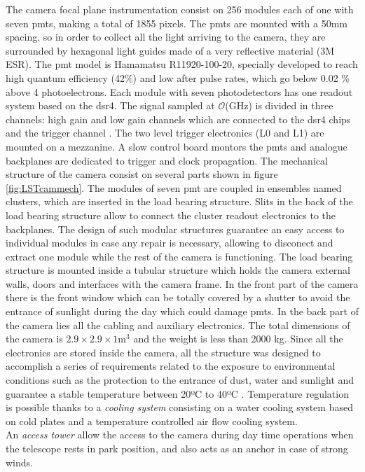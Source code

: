 \documentclass[main.tex]{subfiles}
\begin{document}
  The camera focal plane instrumentation consist on 256 modules each of one with seven \glspl{pmt}, making a total of 1855 pixels. The \glspl{pmt} are mounted with a 50mm spacing, so in order to collect all the light arriving to the camera, they are surrounded by hexagonal light guides made of a very reflective material (3M ESR). The \gls{pmt} model is Hamamatsu R11920-100-20, specially developed to reach high quantum efficiency (42\%) and low after pulse rates, which go below 0.02 \% above 4 photoelectrons. Each module with seven photodetectors has one readout system based on the \gls{dsr4}. The signal sampled at $\mathcal{O}$(GHz) is divided in three channels: high gain and low gain channels which are connected to the \gls{dsr4} chips and the trigger channel \cite{2017LST}. The two level trigger electronics (L0 and L1) are mounted on a mezzanine. A slow control board montors the \glspl{pmt} and analogue backplanes are dedicated to trigger and clock propagation.  
  The mechanical structure of the camera consist on several parts shown in figure \ref{fig:LSTcammech}. The modules of seven \gls{pmt} are coupled in ensembles named clusters, which are inserted in the load bearing structure. Slits in the back of the load bearing structure allow to connect the cluster readout electronics to the  backplanes. The design of such modular structures guarantee an easy access to individual modules in case any repair is necessary, allowing to disconect and extract one module while the rest of the camera is functioning.
  The load bearing structure is mounted inside a tubular structure which holds the camera external walls, doors and interfaces with the camera frame. In the front part of the camera there is the front window which can be totally covered by a shutter to avoid the entrance of sunlight during the day which could damage \glspl{pmt}. In the back part of the camera lies all the cabling and auxiliary electronics. The total dimensions of the camera is $2.9\times2.9\times 1$m$^3$ and the weight is less than 2000 kg. Since all the electronics are stored inside the camera, all the structure was designed to accomplish a series of requirements related to the exposure to environmental conditions such as the protection to the entrance of dust, water and sunlight and guarantee a stable temperature between 20ºC to 40ºC \cite{2013LSTCamMech}. Temperature regulation is possible thanks to a \textit{cooling system} consisting on a water cooling system based on cold plates and a temperature controlled air flow cooling system.\\
 An \textit{access tower} allow the access to the camera during day time operations when the telescope rests in park position, and also acts as an anchor in case of strong winds. 
\end{document}
